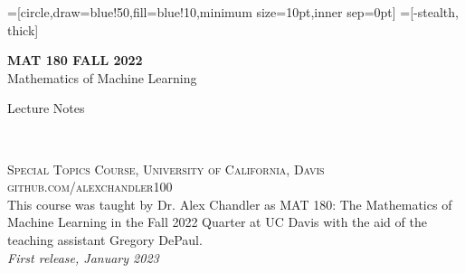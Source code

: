 
\usetikzlibrary{positioning}
=[circle,draw=blue!50,fill=blue!10,minimum size=10pt,inner sep=0pt]
=[-stealth, thick]
\def\R{\mathbb{R}}



\begingroup
\thispagestyle{empty}
\centering
\vspace*{9cm}
\par\normalfont\fontsize{35}{35}\sffamily\selectfont
\textbf{MAT 180 FALL 2022}\\
{\LARGE Mathematics of Machine Learning}\par %
\vspace*{1cm}
{\Huge Lecture Notes}\par %
\endgroup


\newpage
~\vfill
\thispagestyle{empty}


\noindent \textsc{Special Topics Course, University of California, Davis}\\

\noindent \textsc{github.com/alexchandler100}\\ %

\noindent This course was taught by Dr. Alex Chandler as MAT 180: The Mathematics of Machine Learning in the Fall 2022 Quarter at UC Davis with the aid of the teaching assistant Gregory DePaul.\\ %

\noindent \textit{First release, January 2023} %


